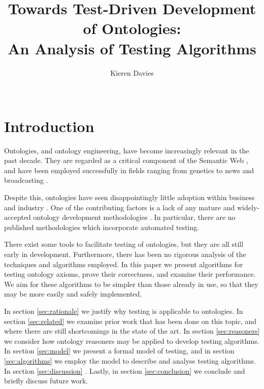 \documentclass[draft]{sig-alternate}
\begin{document}
\title{Towards Test-Driven Development of Ontologies: \\
  An Analysis of Testing Algorithms}
\author{
  \alignauthor
  Kieren Davies\\
   \\
}
\maketitle

\begin{abstract}
\end{abstract}

\section{Introduction}
\label{sec:intro}

Ontologies, and ontology engineering, have become increasingly relevant in the past decade.  They are regarded as a critical component of the Semantic Web \cite{BernersLee:SemanticWeb}, and have been employed successfully in fields ranging from genetics \cite{GeneOntology:GoingForward} to news and broadcasting \cite{BBC:LinkedData}.

Despite this, ontologies have seen disappointingly little adoption within business and industry \cite{Cardoso:SemanticWebVision, Kaczmarek:EnterpriseModelling}.  One of the contributing factors is a lack of any mature and widely-accepted ontology development methodologies \cite{Iqbal:Methodologies}.  In particular, there are no published methodologies which incorporate automated testing.

There exist some tools to facilitate testing of ontologies, but they are all still early in development.  Furthermore, there has been no rigorous analysis of the techniques and algorithms employed.  In this paper we present algorithms for testing ontology axioms, prove their correctness, and \todo[maybe?] examine their performance.  We aim for these algorithms to be simpler than those already in use, so that they may be more easily and safely implemented.  

In section \ref{sec:rationale} we justify why testing is applicable to ontologies.
In section \ref{sec:related} we examine prior work that has been done on this topic, and where there are still shortcomings in the state of the art.
In section \ref{sec:reasoners} we consider how ontology reasoners may be applied to develop testing algorithms.
In section \ref{sec:model} we present a formal model of testing, and in section \ref{sec:algorithms} we employ the model to describe and analyse testing algorithms.
In section \ref{sec:discussion} .
Lastly, in section \ref{sec:conclusion} we conclude and briefly discuss future work.
\end{document}
